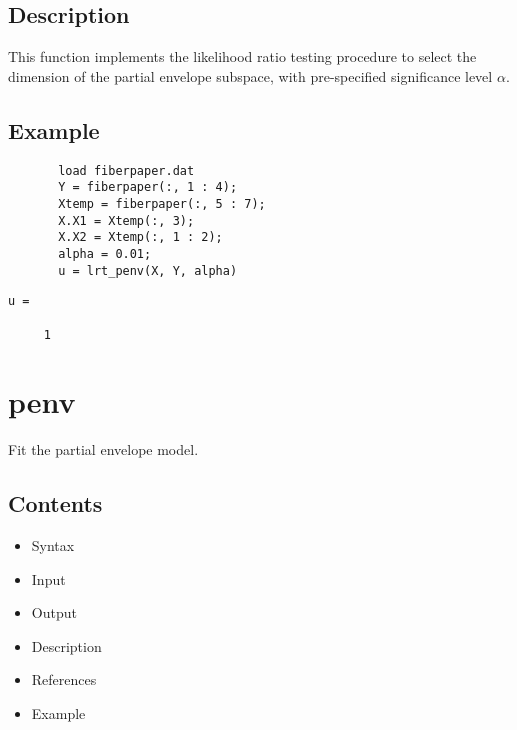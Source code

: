\documentclass[a4paper,11pt,openany]{memoir}
\begin{document}
\subsection*{Description}

\begin{par}
This function implements the likelihood ratio testing procedure to select the dimension of the partial envelope subspace, with pre-specified significance level $\alpha$.
\end{par} \vspace{1em}


\subsection*{Example}


\begin{verbatim}       load fiberpaper.dat
       Y = fiberpaper(:, 1 : 4);
       Xtemp = fiberpaper(:, 5 : 7);
       X.X1 = Xtemp(:, 3);
       X.X2 = Xtemp(:, 1 : 2);
       alpha = 0.01;
       u = lrt_penv(X, Y, alpha)\end{verbatim}
    
        \color{lightgray}\ttfamily \begin{verbatim}
u =

     1

\end{verbatim} \rmfamily
\color{black}


\newpage

\rmfamily
\color{black}\section{penv}

\begin{par}
Fit the partial envelope model.
\end{par} \vspace{1em}

\subsection*{Contents}

\begin{itemize}
\setlength{\itemsep}{-1ex}
   \item Syntax
   \item Input
   \item Output
   \item Description
   \item References
   \item Example
\end{itemize}
\end{document}
